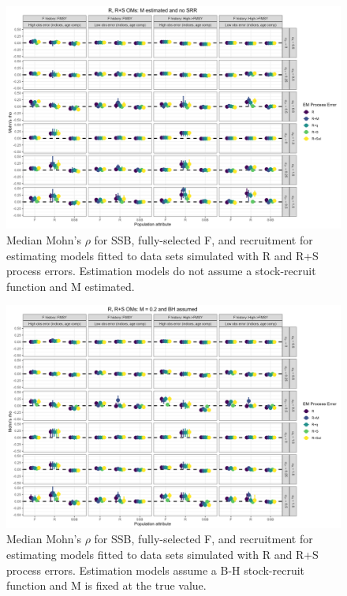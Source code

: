 \documentclass[
  12pt,
]{article}
\begin{document}
\begin{landscape}
\begin{figure}
\caption{Median Mohn's $\rho$ for SSB, fully-selected F, and recruitment for estimating models fitted to data sets simulated with R and R+S process errors.  Estimation models do not assume a stock-recruit function and M estimated.}\label{naa_om_em_R_ME_mohns_rho}
\begin{center}
\includegraphics[width = \textwidth]{naa_om_mohns_rho_R_ME.png}
\end{center}
\end{figure}
\end{landscape}

\begin{landscape}
\begin{figure}
\caption{Median Mohn's $\rho$ for SSB, fully-selected F, and recruitment for estimating models fitted to data sets simulated with R and R+S process errors.  Estimation models assume a B-H stock-recruit function and M is fixed at the true value.}\label{naa_om_em_BH_MF_mohns_rho}
\begin{center}
\includegraphics[width = \textwidth]{naa_om_mohns_rho_BH_MF.png}
\end{center}
\end{figure}
\end{landscape}
\end{document}
